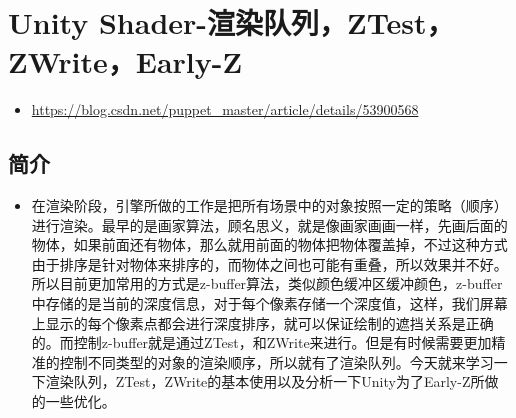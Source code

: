 \documentclass[9pt, b5paper]{article}
\begin{document}
\section{Unity Shader-渲染队列，ZTest，ZWrite，Early-Z}
\label{sec-2}
\begin{itemize}
\item \url{https://blog.csdn.net/puppet_master/article/details/53900568}
\end{itemize}
\subsection{简介}
\label{sec-2-1}
\begin{itemize}
\item 在渲染阶段，引擎所做的工作是把所有场景中的对象按照一定的策略（顺序）进行渲染。最早的是画家算法，顾名思义，就是像画家画画一样，先画后面的物体，如果前面还有物体，那么就用前面的物体把物体覆盖掉，不过这种方式由于排序是针对物体来排序的，而物体之间也可能有重叠，所以效果并不好。所以目前更加常用的方式是z-buffer算法，类似颜色缓冲区缓冲颜色，z-buffer中存储的是当前的深度信息，对于每个像素存储一个深度值，这样，我们屏幕上显示的每个像素点都会进行深度排序，就可以保证绘制的遮挡关系是正确的。而控制z-buffer就是通过ZTest，和ZWrite来进行。但是有时候需要更加精准的控制不同类型的对象的渲染顺序，所以就有了渲染队列。今天就来学习一下渲染队列，ZTest，ZWrite的基本使用以及分析一下Unity为了Early-Z所做的一些优化。
\end{itemize}
\end{document}
